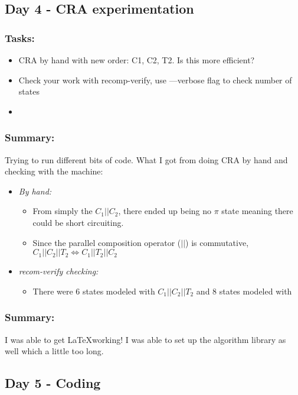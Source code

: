 \documentclass[11pt]{article}
\begin{document}
\subsection{Day 4 - CRA experimentation}
\subsubsection*{Tasks:}
\begin{itemize}
  \item CRA by hand with new order: C1, C2, T2. Is this more efficient?
  \item Check your work with recomp-verify, use —verbose flag to check number of states
  \item 
\end{itemize}

\subsubsection*{Summary:}
Trying to run different bits of code. What I got from doing CRA by hand and checking with the machine:
\begin{itemize}
  \item \emph{By hand:}
  \begin{itemize}
    \item From simply the $C_1 || C_2$, there ended up being no $\pi$ state meaning there could be short circuiting.
    \item Since the parallel composition operator ($||$) is commutative, $C_1||C_2||T_2 \Leftrightarrow C_1||T_2||C_2$
  \end{itemize}
  \item \emph{\emph{recom-verify checking:}}
  \begin{itemize}
    \item There were 6 states modeled with $C_1||C_2||T_2$ and 8 states modeled with 
  \end{itemize}
\end{itemize}

\subsubsection*{Summary:}
I was able to get \LaTeX working! I was able to set up the algorithm library as well
which a little too long.

\subsection{Day 5 - Coding}
\end{document}
